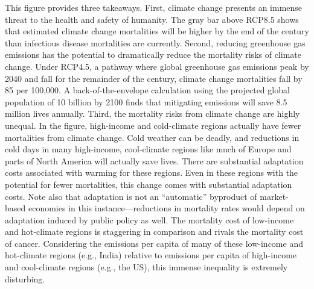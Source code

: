 This figure provides three takeaways. First, climate change presents an immense threat to the health and safety of humanity. The gray bar above RCP8.5 shows that estimated climate change mortalities will be higher by the end of the century than infectious disease mortalities are currently. Second, reducing greenhouse gas emissions has the potential to dramatically reduce the mortality risks of climate change. Under RCP4.5, a pathway where global greenhouse gas emissions peak by 2040 and fall for the remainder of the century, climate change mortalities fall by 85 per 100,000. A  back-of-the-envelope calculation using the projected global population of 10 billion by 2100 finds that mitigating emissions will save 8.5 million lives annually. Third, the mortality risks from climate change are highly unequal. In the figure, high-income and cold-climate regions actually have fewer mortalities from climate change. Cold weather can be deadly, and reductions in cold days in many high-income, cool-climate regions like much of Europe and parts of North America will actually save lives. There are substantial adaptation costs associated with warming for these regions. Even in these regions with the potential for fewer mortalities, this change comes with substantial adaptation costs. Note also that adaptation is not an ``automatic'' byproduct of market-based economies in this instance---reductions in mortality rates would depend on adaptation induced by public policy as well. The mortality cost of low-income and hot-climate regions is staggering in comparison and rivals the mortality cost of cancer. Considering the emissions per capita of many of these low-income and hot-climate regions (e.g., India) relative to emissions per capita of high-income and cool-climate regions (e.g., the US), this immense inequality is extremely disturbing. 

